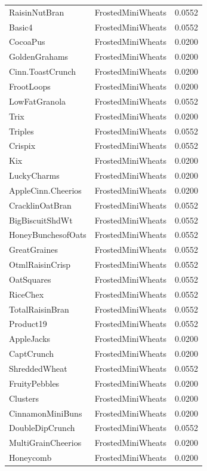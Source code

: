 \begin{table}[!htbp]
\begin{tabular}{lll}
\\
RaisinNutBran & FrostedMiniWheats & 0.0552
\\
Basic4 & FrostedMiniWheats & 0.0552
\\
CocoaPus & FrostedMiniWheats & 0.0200
\\
GoldenGrahams & FrostedMiniWheats & 0.0200
\\
Cinn.ToastCrunch & FrostedMiniWheats & 0.0200
\\
FrootLoops & FrostedMiniWheats & 0.0200
\\
LowFatGranola & FrostedMiniWheats & 0.0552
\\
Trix & FrostedMiniWheats & 0.0200
\\
Triples & FrostedMiniWheats & 0.0552
\\
Crispix & FrostedMiniWheats & 0.0552
\\
Kix & FrostedMiniWheats & 0.0200
\\
LuckyCharms & FrostedMiniWheats & 0.0200
\\
AppleCinn.Cheerios & FrostedMiniWheats & 0.0200
\\
CracklinOatBran & FrostedMiniWheats & 0.0552
\\
BigBiscuitShdWt & FrostedMiniWheats & 0.0552
\\
HoneyBunchesofOats & FrostedMiniWheats & 0.0552
\\
GreatGraines & FrostedMiniWheats & 0.0552
\\
OtmlRaisinCrisp & FrostedMiniWheats & 0.0552
\\
OatSquares & FrostedMiniWheats & 0.0552
\\
RiceChex & FrostedMiniWheats & 0.0552
\\
TotalRaisinBran & FrostedMiniWheats & 0.0552
\\
Product19 & FrostedMiniWheats & 0.0552
\\
AppleJacks & FrostedMiniWheats & 0.0200
\\
CaptCrunch & FrostedMiniWheats & 0.0200
\\
ShreddedWheat & FrostedMiniWheats & 0.0552
\\
FruityPebbles & FrostedMiniWheats & 0.0200
\\
Clusters & FrostedMiniWheats & 0.0200
\\
CinnamonMiniBuns & FrostedMiniWheats & 0.0200
\\
DoubleDipCrunch & FrostedMiniWheats & 0.0552
\\
MultiGrainCheerios & FrostedMiniWheats & 0.0200
\\
Honeycomb & FrostedMiniWheats & 0.0200

\end{tabular}
\end{table}
